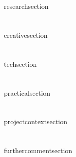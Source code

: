 \documentclass[11pt]{article} %
\begin{document}
\ifdefined\ResearchSection
  \section*{\ResearchSection}
  \label{research}
  {researchsection}
\fi


\ifdefined\CreativeApproach
  \section*{\CreativeApproach}
  \label{creative}
  {creativesection}
\fi

\ifdefined\TechApproach
  \section*{\TechApproach}
  \label{tech}
  {techsection}
\fi

\ifdefined\PracticalApproach
  \section*{\PracticalApproach}
  \label{practical}
  {practicalsection}
\fi

\ifdefined\ProjectContext
  \section*{\ProjectContext}
  \label{context}
  {projectcontextsection}
\fi

\ifdefined\FurtherComments
  \section*{\FurtherComments}
  \label{further}
  {furthercommentsection}
\fi

\clearpage


\printbibliography[title={Bibliography}, heading=bibintoc] %
\label{references}
\end{document}
